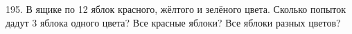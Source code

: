 195. В ящике по 12 яблок красного, жёлтого и зелёного цвета. Сколько попыток дадут 3 яблока одного цвета? Все красные яблоки? Все яблоки разных цветов?\\
